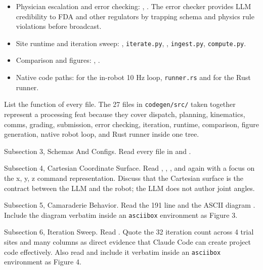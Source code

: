 \begin{sectionaccent}
\begin{itemize}
        simulation. Discuss that 67 lines is the right scale for a
        signed JSON submitter and that the small surface area is a
        regulatory feature, not a limitation.
  \item Physician escalation and error checking:
        ,
        . The error checker provides LLM
        credibility to FDA and other regulators by trapping schema
        and physics rule violations before broadcast.
  \item Site runtime and iteration sweep:
        , \texttt{iterate.py},
        , \texttt{ingest.py},
        \texttt{compute.py}.
  \item Comparison and figures: ,
        .
  \item Native code paths:  for the in-robot
        10 Hz loop, \texttt{runner.rs} and 
        for the Rust runner.
\end{itemize}
List the function of every file. The 27 files in
\texttt{codegen/src/} taken together represent a processing feat
because they cover dispatch, planning, kinematics, comms, grading,
submission, error checking, iteration, runtime, comparison, figure
generation, native robot loop, and Rust runner inside one tree.

Subsection 3, Schemas And Configs. Read every file in
 and
.

Subsection 4, Cartesian Coordinate Surface. Read
,
, , and
 again with a focus on the x, y, z command
representation. Discuss that the Cartesian surface is the contract
between the LLM and the robot; the LLM does not author joint angles.

Subsection 5, Camaraderie Behavior. Read the 191 line
 and the ASCII diagram
.
Include the diagram verbatim inside an \texttt{asciibox} environment
as Figure 3.

Subsection 6, Iteration Sweep. Read
.
Quote the 32 iteration count across 4 trial sites and many columns as
direct evidence that Claude Code can create project code effectively.
Also read 
and include it verbatim inside an \texttt{asciibox} environment as
Figure 4.


\end{sectionaccent}
